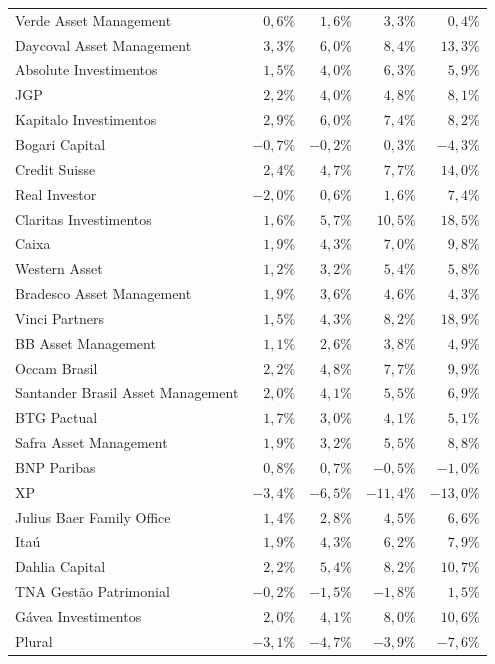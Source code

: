 \documentclass[11pt,a4paper]{article}
\begin{document}
\begin{center}
\begin{longtable}{@{}lrrrr@{}}
Verde Asset Management & $0{,}6\%$ & $1{,}6\%$ & $3{,}3\%$ & $0{,}4\%$ \\
Daycoval Asset Management & $3{,}3\%$ & $6{,}0\%$ & $8{,}4\%$ & $13{,}3\%$ \\
Absolute Investimentos & $1{,}5\%$ & $4{,}0\%$ & $6{,}3\%$ & $5{,}9\%$ \\
JGP & $2{,}2\%$ & $4{,}0\%$ & $4{,}8\%$ & $8{,}1\%$ \\
Kapitalo Investimentos & $2{,}9\%$ & $6{,}0\%$ & $7{,}4\%$ & $8{,}2\%$ \\
Bogari Capital & $-0{,}7\%$ & $-0{,}2\%$ & $0{,}3\%$ & $-4{,}3\%$ \\
Credit Suisse & $2{,}4\%$ & $4{,}7\%$ & $7{,}7\%$ & $14{,}0\%$ \\
Real Investor & $-2{,}0\%$ & $0{,}6\%$ & $1{,}6\%$ & $7{,}4\%$ \\
Claritas Investimentos & $1{,}6\%$ & $5{,}7\%$ & $10{,}5\%$ & $18{,}5\%$ \\
Caixa & $1{,}9\%$ & $4{,}3\%$ & $7{,}0\%$ & $9{,}8\%$ \\
Western Asset & $1{,}2\%$ & $3{,}2\%$ & $5{,}4\%$ & $5{,}8\%$ \\
Bradesco Asset Management & $1{,}9\%$ & $3{,}6\%$ & $4{,}6\%$ & $4{,}3\%$ \\
Vinci Partners & $1{,}5\%$ & $4{,}3\%$ & $8{,}2\%$ & $18{,}9\%$ \\
BB Asset Management & $1{,}1\%$ & $2{,}6\%$ & $3{,}8\%$ & $4{,}9\%$ \\
Occam Brasil & $2{,}2\%$ & $4{,}8\%$ & $7{,}7\%$ & $9{,}9\%$ \\
Santander Brasil Asset Management & $2{,}0\%$ & $4{,}1\%$ & $5{,}5\%$ & $6{,}9\%$ \\
BTG Pactual & $1{,}7\%$ & $3{,}0\%$ & $4{,}1\%$ & $5{,}1\%$ \\
Safra Asset Management & $1{,}9\%$ & $3{,}2\%$ & $5{,}5\%$ & $8{,}8\%$ \\
BNP Paribas & $0{,}8\%$ & $0{,}7\%$ & $-0{,}5\%$ & $-1{,}0\%$ \\
XP & $-3{,}4\%$ & $-6{,}5\%$ & $-11{,}4\%$ & $-13{,}0\%$ \\
Julius Baer Family Office & $1{,}4\%$ & $2{,}8\%$ & $4{,}5\%$ & $6{,}6\%$ \\
Itaú & $1{,}9\%$ & $4{,}3\%$ & $6{,}2\%$ & $7{,}9\%$ \\
Dahlia Capital & $2{,}2\%$ & $5{,}4\%$ & $8{,}2\%$ & $10{,}7\%$ \\
TNA Gestão Patrimonial & $-0{,}2\%$ & $-1{,}5\%$ & $-1{,}8\%$ & $1{,}5\%$ \\
Gávea Investimentos & $2{,}0\%$ & $4{,}1\%$ & $8{,}0\%$ & $10{,}6\%$ \\
Plural & $-3{,}1\%$ & $-4{,}7\%$ & $-3{,}9\%$ & $-7{,}6\%$ \\
\end{longtable}
\end{center}
\end{document}
